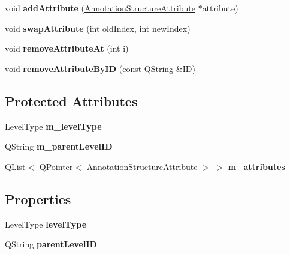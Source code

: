 \begin{DoxyCompactItemize}
\item 
\mbox{\label{class_annotation_structure_level_adbf3154e9893a0ea975751638b277bf2}} 
void {\bfseries add\+Attribute} (\hyperlink{class_annotation_structure_attribute}{Annotation\+Structure\+Attribute} $\ast$attribute)
\item 
\mbox{\label{class_annotation_structure_level_af9d0d8200d766bd166051feaad209e8a}} 
void {\bfseries swap\+Attribute} (int old\+Index, int new\+Index)
\item 
\mbox{\label{class_annotation_structure_level_a7640b925290bd80f46aa0931043abb1b}} 
void {\bfseries remove\+Attribute\+At} (int i)
\item 
\mbox{\label{class_annotation_structure_level_a8d8865e606c5ee399d7b0e3e904f0e19}} 
void {\bfseries remove\+Attribute\+By\+ID} (const Q\+String \&ID)
\end{DoxyCompactItemize}
\subsection*{Protected Attributes}
\begin{DoxyCompactItemize}
\item 
\mbox{\label{class_annotation_structure_level_a76285d7e363afd93464bd7ef7ed048ec}} 
Level\+Type {\bfseries m\+\_\+level\+Type}
\item 
\mbox{\label{class_annotation_structure_level_a6a5eee5ebd6f8e266be3ac2fa09f6ccc}} 
Q\+String {\bfseries m\+\_\+parent\+Level\+ID}
\item 
\mbox{\label{class_annotation_structure_level_a74c9169103a7c2d818feb6465156786e}} 
Q\+List$<$ Q\+Pointer$<$ \hyperlink{class_annotation_structure_attribute}{Annotation\+Structure\+Attribute} $>$ $>$ {\bfseries m\+\_\+attributes}
\end{DoxyCompactItemize}
\subsection*{Properties}
\begin{DoxyCompactItemize}
\item 
\mbox{\label{class_annotation_structure_level_ac4e448ffc536acb2c7c43c5988aeb925}} 
Level\+Type {\bfseries level\+Type}
\item 
\mbox{\label{class_annotation_structure_level_a2dfe6d8522dcfa8d86d9177ae8b282af}} 
Q\+String {\bfseries parent\+Level\+ID}
\end{DoxyCompactItemize}


